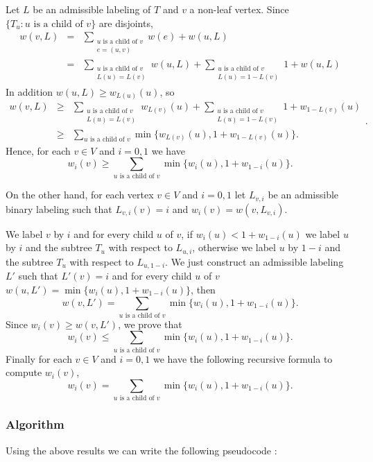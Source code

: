 \documentclass[letterpaper,12pt]{article}
\begin{document}
Let $L$ be an admissible labeling of $T$ and $v$ a non-leaf vertex. Since $\{T_u : u\text{ is a child of }v\}$ are disjoints, $$\begin{array}{ccl}
    w(v, L) &=& \displaystyle\sum_{\substack{u\text{ is a child of }v\\ e =(u,v)}} w(e) + w(u, L)\\
    &=& \displaystyle\sum_{\substack{u\text{ is a child of }v\\ L(u)=L(v)}} w(u, L) + \sum_{\substack{u\text{ is a child of }v\\ L(u)=1-L(v)}} 1+w(u, L) \end{array}$$ In addition $w(u, L) \ge w_{L(u)}(u)$, so $$\begin{array}{ccl}
    w(v,L) & \ge & \displaystyle \sum_{\substack{u\text{ is a child of }v\\ L(u)=L(v)}} w_{L(v)}(u) + \sum_{\substack{u\text{ is a child of }v\\ L(u)=1-L(v)}} 1+w_{1-L(v)}(u)\\
     & \ge & \displaystyle \sum_{u\text{ is a child of }v} \min \{w_{L(v)}(u), 1+w_{1-L(v)}(u)\}.
\end{array} .$$
Hence, for each $v\in V$ and $i=0,1$ we have $$w_i(v) \ge \sum_{u\text{ is a child of }v} \min\{w_i(u),1+w_{1-i}(u)\}.$$

On the other hand, for each vertex $v\in V$ and $i = 0,1$ let $L_{v,i}$ be an admissible binary labeling such that $L_{v,i}(v) = i$ and $w_i(v) = w(v, L_{v,i})$.

We label $v$ by $i$ and for every child $u$ of $v$, if $w_i(u) < 1 + w_{1-i}(u)$ we label $u$ by $i$ and the subtree $T_u$ with respect to $L_{u, i}$, otherwise we label $u$ by $1-i$ and the subtree $T_u$ with respect to $L_{u, 1-i}$. We just construct an admissible labeling $L'$ such that $L'(v) = i$ and for every child $u$ of $v$ $w(u, L') = \min \{w_i(u), 1+w_{1-i}(u)\}$, then $$w(v, L') = \sum_{u\text{ is a child of }v} \min\{w_i(u),1+w_{1-i}(u)\}.$$ Since $w_i(v) \ge w(v, L')$, we prove that $$w_i(v) \le \sum_{u\text{ is a child of }v} \min\{w_i(u),1+w_{1-i}(u)\}.$$ Finally for each $v \in V$ and $i = 0,1$ we have the following recursive formula to compute $w_i(v)$, $$w_i(v) = \sum_{u\text{ is a child of }v} \min\{w_i(u),1+w_{1-i}(u)\}. $$

\subsubsection{Algorithm}
Using the above results we can write the following pseudocode :
\end{document}
